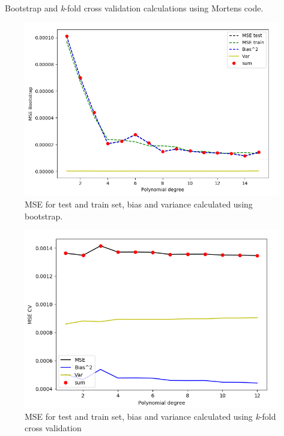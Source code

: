 \documentclass[a4paper,11pt,twocolumn]{article}
\begin{document}
\
Bootstrap and \textit{k}-fold cross validation calculations using Mortens code.

\begin{figure}[h]
\centering
\includegraphics[scale=0.75]{msebootstrap}
\caption{MSE for test and train set, bias and variance calculated using bootstrap.}
\label{msebootstrap}
\end{figure}

\begin{figure}[h]
\centering
\includegraphics[scale=0.75]{msekfold}
\caption{MSE for test and train set, bias and variance calculated using \textit{k}-fold cross validation}
\label{conflasso}
\end{figure} 
\end{document}
